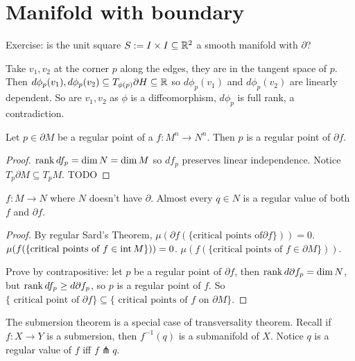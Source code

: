\documentclass[12pt,class=article,crop=false]{standalone}
\begin{document}
\section{Manifold with boundary}
Exercise: is the unit square $ S := I \times I \subseteq \mathbb{R}^2$ a smooth manifold with $ \partial $?

Take $ v_1,v_2$ at the corner $ p$ along the edges, they are in the tangent space of $ p$. Then $ d \phi_p (v_1), d \phi_p(v_2) \subseteq T_{\phi(p)} \partial  H \subseteq \mathbb{R}$ so $ d\phi_p(v_1) $ and $ d \phi_p(v_2)$ are linearly dependent. So are $ v_1,v_2$ as $ \phi$ is a diffeomorphism, $ d \phi_p$ is full rank, a contradiction.

\begin{prop}
Let $ p \in \partial M$ be a regular point of a $ f: M^{n} \to N^{n}$. Then $ p$ is a regular point of  $ \partial f$.
\end{prop}
\begin{proof}
$ \operatorname{rank} df_p = \dim N = \dim M$ so $ df_p$ preserves linear independence. Notice $ T_p \partial M \subseteq T_p M$.  TODO
\end{proof}

\begin{thm}[Sard's]
$ f: M \to N$ where $ N$ doesn't have  $ \partial $. Almost every $ q \in N$ is a regular value of both $ f$ and  $ \partial f$.
\end{thm}
\begin{proof}
	By regular Sard's Theorem, $ \mu(\partial f ( \{ \text{critical points of} \partial f \})) = 0$. $ \mu(f(\{ \text{critical points of } f \in \operatorname{int} M \} )) = 0$. $ \mu(f( \{ \text{critical points of } f \in \partial M \} ))$.

	Prove by contrapositive: let $ p$ be a regular point of  $ \partial f$, then $ \operatorname{rank} d \partial f_p = \dim N$, but $ \operatorname{rank} df_p \geq d \partial f_p$, so $ p$ is a regular point of  $ f$. So  $ \{ \text{ critical point of } \partial f \} \subseteq \{ \text{ critical points of } f \text{ on } \partial M \} $.
\end{proof}

\begin{thm}[transversality]

\end{thm}

\begin{remark}
The submersion theorem is a special case of transversality theorem. Recall if $ f: X \to Y$ is a submersion, then  $ f^{-1}(q)$ is a submanifold of $ X$. Notice $ q$ is a regular value of  $ f$ iff  $ f \pitchfork q$.
\end{remark}
\end{document}
